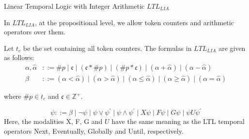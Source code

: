 \documentclass [serif,professionalfont]{beamer}
\newcommand{\LC}{$LTL_{LIA}$}
\begin{document}
\begin{frame}{Linear Temporal Logic with Integer Arithmetic {\LC}}


    In {\LC}, at the propositional level, we allow token counters and arithmetic operators over them.

    Let $t_c$ be the set containing all token counters. The formulas in {\LC} are given as follows:
    \begin{equation}
        \begin{split}
            \alpha , \hat{\alpha}&::= \#p \mid \mathfrak{c} \mid (\mathfrak{c} \ast \#p ) \mid  (\#p \ast \mathfrak{c}) \mid (\alpha + \hat{\alpha} ) \mid (\alpha - \hat{\alpha})\\ \nonumber
            \beta &::=  (\alpha < \hat{\alpha}) \mid (\alpha > \hat{\alpha}) \mid (\alpha \le \hat{\alpha}) \mid  (\alpha \ge \hat{\alpha}) \mid (\alpha=\hat{\alpha})
        \end{split}
    \end{equation}


    \noindent where $\#p \in t_c$ and $\mathfrak{c} \in \mathbb{Z}^+$.


    \[\psi::= \beta \mid \lnot \psi  \mid \psi\lor\psi^{\prime}   \mid \psi\land\psi^{\prime}  \mid  X \psi  \mid F \psi\mid G \psi \mid \psi U  \psi^{\prime}\]
    Here, the modalities X, F, G and $U$ have the same meaning as the LTL temporal operators Next, Eventually, Globally and Until, respectively.





\end{frame}
\end{document}
